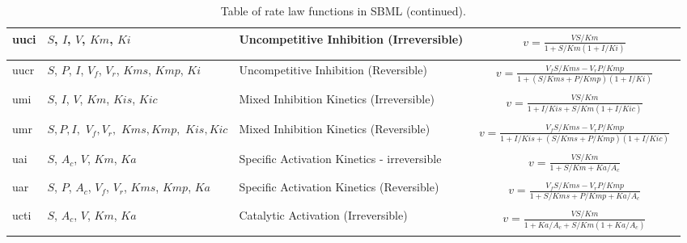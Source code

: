 \documentclass[10pt]{cek-article}
\begin{document}
\begin{table}[ht]
\begin{tabular}{|p{0.5in}|>{\raggedright}m{0.77in}|>{\raggedright}m{1.5in}|m{3.2in}|}
uuci & $S$, $I$, $V$, $Km$, $Ki$ & Uncompetitive Inhibition
(Irreversible) &
\begin{gather*}
v = \frac{V S/Km}{1 + S/Km \left( 1 + I/Ki\right)}
\end{gather*}
\\ \hline

uucr & $S$, $P$, $I$, $V_f$, $V_r$, $Kms$, $Kmp$, $Ki$ &
Uncompetitive Inhibition (Reversible) &
\begin{gather*}
v = \frac{V_f S/Kms - V_r
P/Kmp}{1 + \left( S/Kms + P/Kmp \right) \left( 1 + I/Ki\right) }
\end{gather*}
\\ \hline

umi & $S$, $I$, $V$, $Km$, $Kis$, $Kic$ & Mixed Inhibition
Kinetics (Irreversible) &
\begin{gather*}
v = \frac{V S/Km}{1 + I/Kis + S/Km \left( 1 + I/Kic \right) }
\end{gather*}
\\ \hline

umr & $ S, P, I,$ $ V_f, V_r, $ $ Kms, Kmp, $ $ Kis, Kic $ & Mixed
Inhibition Kinetics (Reversible) &
\begin{gather*}
v = \frac{V_f S/Kms - V_r
P/Kmp}{1 + I/Kis + \left( S/Kms + P/Kmp \right) \left( 1 + I/Kic
\right) }
\end{gather*}
\\ \hline

uai & $S$, $A_c$, $V$, $Km$, $Ka$ & Specific Activation Kinetics -
irreversible &
\begin{gather*}
v = \frac{V S/Km}{1 + S/Km + Ka/A_c}
\end{gather*}
\\ \hline

uar & $S$, $P$, $A_c$, $V_f$, $V_r$, $Kms$, $Kmp$, $Ka$ & Specific
Activation Kinetics (Reversible) &
\begin{gather*}
v = \frac{V_f S/Kms - V_r P/Kmp}{1 + S/Kms + P/Kmp + Ka/A_c}
\end{gather*}
\\ \hline

ucti & $S$, $A_c$, $V$, $Km$, $Ka$ & Catalytic Activation
(Irreversible) &
\begin{gather*}
v = \frac{V S/Km}{1 + Ka/A_c + S/Km \left( 1 + Ka/A_c\right)}
\end{gather*}
\\ \hline

\end{tabular}
\caption{Table of rate law functions in SBML (continued).}
\end{table}
\end{document}
